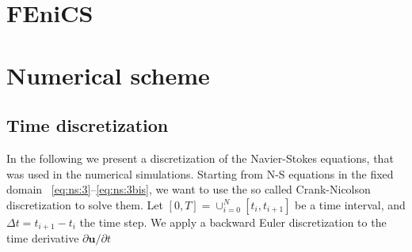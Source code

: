 \documentclass[a4paper,11pt,openright,twoside]{book}
\begin{document}
%








\section{FEniCS}

\section{Numerical scheme}

\subsection{Time discretization}
In the following we present a discretization of the Navier-Stokes equations, that was used in the numerical simulations. Starting from N-S equations in the fixed domain ~\eqref{eq:ns:3}--\eqref{eq:ns:3bis}, we want to use the so called Crank-Nicolson discretization to solve them. Let $[0, T] = \cup^N_{i=0} [t_i, t_{i+1}] $ be a time interval, and $\Delta t = t_{i+1} - t_i$ the time step. We apply a backward Euler discretization to the time derivative $\partial \mathbf{u}/ \partial t$
\end{document}
